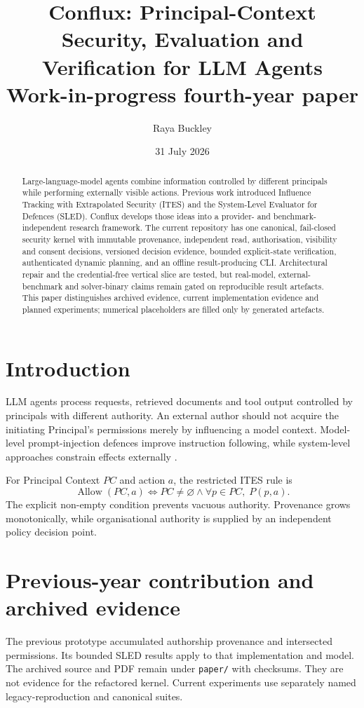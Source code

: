 \documentclass[11pt]{article}
\title{Conflux: Principal-Context Security, Evaluation and Verification for LLM Agents\\\large Work-in-progress fourth-year paper}
\author{Raya Buckley}
\date{31 July 2026}
\begin{document}
\maketitle

\begin{abstract}
Large-language-model agents combine information controlled by different
principals while performing externally visible actions. Previous work
introduced Influence Tracking with Extrapolated Security (ITES) and the
System-Level Evaluator for Defences (SLED). Conflux develops those ideas into a
provider- and benchmark-independent research framework. The current repository
has one canonical, fail-closed security kernel with immutable provenance,
independent read, authorisation, visibility and consent decisions, versioned
decision evidence, bounded explicit-state verification, authenticated dynamic
planning, and an offline result-producing CLI. Architectural repair and the
credential-free vertical slice are tested, but real-model, external-benchmark
and solver-binary claims remain gated on reproducible result artefacts. This paper distinguishes
archived evidence, current implementation evidence and planned experiments;
numerical placeholders are filled only by generated artefacts.
\end{abstract}

\section{Introduction}
LLM agents process requests, retrieved documents and tool output controlled by
principals with different authority. An external author should not acquire the
initiating Principal's permissions merely by influencing a model context.
Model-level prompt-injection defences improve instruction following, while
system-level approaches constrain effects externally
\citep{camel,designpatterns,struq,spotlighting}.

For Principal Context $PC$ and action $a$, the restricted ITES rule is
\[
  \operatorname{Allow}(PC,a) \Longleftrightarrow
  PC \neq \varnothing \land \forall p \in PC,\;P(p,a).
\]
The explicit non-empty condition prevents vacuous authority. Provenance grows
monotonically, while organisational authority is supplied by an independent
policy decision point.

\section{Previous-year contribution and archived evidence}
The previous prototype accumulated authorship provenance and intersected
permissions. Its bounded SLED results apply to that implementation and model.
The archived source and PDF remain under \texttt{paper/} with checksums. They
are not evidence for the refactored kernel. Current experiments use separately
named legacy-reproduction and canonical suites.
\end{document}
